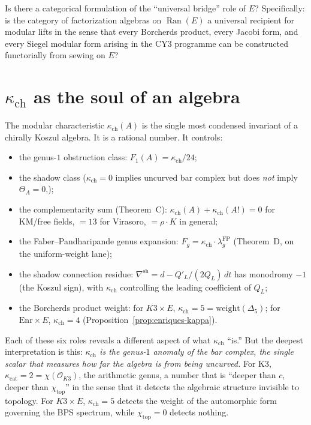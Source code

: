 \documentclass[11pt]{article}
\newcommand{\cO}{\mathcal{O}}
\newcommand{\Ran}{\operatorname{Ran}}
\begin{document}
\begin{question}
Is there a categorical formulation of the ``universal bridge'' role of $E$? Specifically: is the category of factorization algebras on $\Ran(E)$ a universal recipient for modular lifts in the sense that every Borcherds product, every Jacobi form, and every Siegel modular form arising in the CY3 programme can be constructed functorially from sewing on $E$?
\end{question}


\section{$\kappa_{\mathrm{ch}}$ as the soul of an algebra}
\label{sec:motivic-kappa-soul}

The modular characteristic $\kappa_{\mathrm{ch}}(A)$ is the single most condensed invariant of a chirally Koszul algebra. It is a rational number. It controls:
\begin{itemize}
\item the genus-$1$ obstruction class: $F_1(A) = \kappa_{\mathrm{ch}}/24$;
\item the shadow class ($\kappa_{\mathrm{ch}} = 0$ implies uncurved bar complex but does \emph{not} imply $\Theta_A = 0$,);
\item the complementarity sum (Theorem~C): $\kappa_{\mathrm{ch}}(A) + \kappa_{\mathrm{ch}}(A!) = 0$ for KM/free fields, $= 13$ for Virasoro, $= \rho \cdot K$ in general;
\item the Faber--Pandharipande genus expansion: $F_g = \kappa_{\mathrm{ch}} \cdot \lambda_g^{\mathrm{FP}}$ (Theorem~D, on the uniform-weight lane);
\item the shadow connection residue: $\nabla^{\mathrm{sh}} = d - Q'_L/(2Q_L)\, dt$ has monodromy $-1$ (the Koszul sign), with $\kappa_{\mathrm{ch}}$ controlling the leading coefficient of $Q_L$;
\item the Borcherds product weight: for $K3 \times E$, $\kappa_{\mathrm{ch}} = 5 = \mathrm{weight}(\Delta_5)$; for $\mathrm{Enr} \times E$, $\kappa_{\mathrm{ch}} = 4$ (Proposition~\ref{prop:enriques-kappa}).
\end{itemize}

Each of these six roles reveals a different aspect of what $\kappa_{\mathrm{ch}}$ ``is.'' But the deepest interpretation is this: \emph{$\kappa_{\mathrm{ch}}$ is the genus-$1$ anomaly of the bar complex, the single scalar that measures how far the algebra is from being uncurved.} For K3, $\kappa_{\mathrm{cat}} = 2 = \chi(\cO_{K3})$, the arithmetic genus, a number that is ``deeper than $c$, deeper than $\chi_{\mathrm{top}}$'' in the sense that it detects the algebraic structure invisible to topology. For $K3 \times E$, $\kappa_{\mathrm{ch}} = 5$ detects the weight of the automorphic form governing the BPS spectrum, while $\chi_{\mathrm{top}} = 0$ detects nothing.
\end{document}
